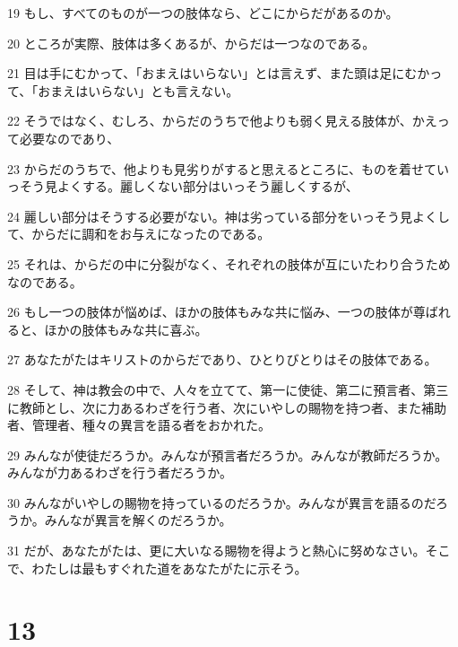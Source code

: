 \par 19 もし、すべてのものが一つの肢体なら、どこにからだがあるのか。
\par 20 ところが実際、肢体は多くあるが、からだは一つなのである。
\par 21 目は手にむかって、「おまえはいらない」とは言えず、また頭は足にむかって、「おまえはいらない」とも言えない。
\par 22 そうではなく、むしろ、からだのうちで他よりも弱く見える肢体が、かえって必要なのであり、
\par 23 からだのうちで、他よりも見劣りがすると思えるところに、ものを着せていっそう見よくする。麗しくない部分はいっそう麗しくするが、
\par 24 麗しい部分はそうする必要がない。神は劣っている部分をいっそう見よくして、からだに調和をお与えになったのである。
\par 25 それは、からだの中に分裂がなく、それぞれの肢体が互にいたわり合うためなのである。
\par 26 もし一つの肢体が悩めば、ほかの肢体もみな共に悩み、一つの肢体が尊ばれると、ほかの肢体もみな共に喜ぶ。
\par 27 あなたがたはキリストのからだであり、ひとりびとりはその肢体である。
\par 28 そして、神は教会の中で、人々を立てて、第一に使徒、第二に預言者、第三に教師とし、次に力あるわざを行う者、次にいやしの賜物を持つ者、また補助者、管理者、種々の異言を語る者をおかれた。
\par 29 みんなが使徒だろうか。みんなが預言者だろうか。みんなが教師だろうか。みんなが力あるわざを行う者だろうか。
\par 30 みんながいやしの賜物を持っているのだろうか。みんなが異言を語るのだろうか。みんなが異言を解くのだろうか。
\par 31 だが、あなたがたは、更に大いなる賜物を得ようと熱心に努めなさい。そこで、わたしは最もすぐれた道をあなたがたに示そう。

\chapter{13}


